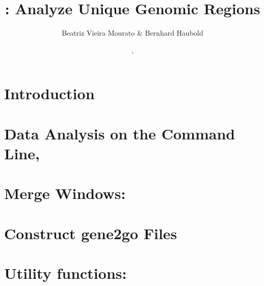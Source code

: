 \documentclass[a4paper]{report}
\begin{document}
\pagestyle{noweb}

\title{: Analyze Unique Genomic Regions}
\author{Beatriz Vieira Mourato \& Bernhard Haubold}
\date{\hspace{-3pt}, }
\maketitle

\tableofcontents

\chapter{Introduction}

\chapter{Data Analysis on the Command Line, }\label{ch:cli}

\chapter{Merge Windows: }\label{ch:me}

\chapter{Construct gene2go Files}\label{ch:g2g}

\chapter{Utility functions: }\label{ch:uti}



\end{document}
